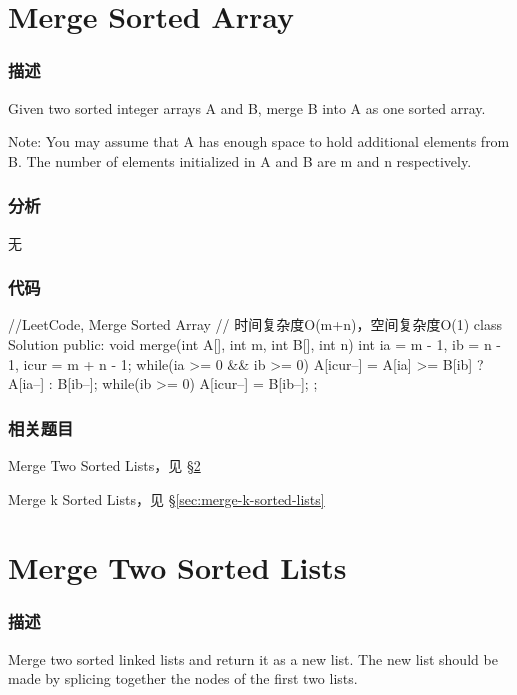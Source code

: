 \section{Merge Sorted Array} %
\label{sec:merge-sorted-array}


\subsubsection{描述}
Given two sorted integer arrays A and B, merge B into A as one sorted array.

Note:
You may assume that A has enough space to hold additional elements from B. The number of elements initialized in A and B are m and n respectively.


\subsubsection{分析}
无


\subsubsection{代码}
\begin{Code}
	//LeetCode, Merge Sorted Array
	// 时间复杂度O(m+n)，空间复杂度O(1)
	class Solution {
		public:
		void merge(int A[], int m, int B[], int n) {
			int ia = m - 1, ib = n - 1, icur = m + n - 1;
			while(ia >= 0 && ib >= 0) {
				A[icur--] = A[ia] >= B[ib] ? A[ia--] : B[ib--];
			}
			while(ib >= 0) {
				A[icur--] = B[ib--];
			}
		}
	};
\end{Code}


\subsubsection{相关题目}
\begindot
\item Merge Two Sorted Lists，见 \S \ref{sec:merge-two-sorted-lists}
\item Merge k Sorted Lists，见 \S \ref{sec:merge-k-sorted-lists}
\myenddot


\section{Merge Two Sorted Lists} %
\label{sec:merge-two-sorted-lists}


\subsubsection{描述}
Merge two sorted linked lists and return it as a new list. The new list should be made by splicing together the nodes of the first two lists.


